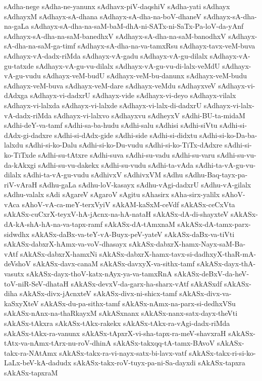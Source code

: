 {sAdha-nege
sAdha-ne-yanunx
sAdhavx-piV-daqshiV
sAdha-yati
sAdhayx
sAdhayxM
sAdhayx-sA-dhana
sAdhayx-sA-dha-na-boV-dhaneV
sAdhayx-sA-dha-na-gaLa
sAdhayx-sA-dha-na-saM-baM-dhA-ni-SATx-ni-SaTx-Pa-loV-da-yAnf
sAdhayx-sA-dha-na-saM-banedhxV
sAdhayx-sA-dha-na-saM-banodhxV
sAdhayx-sA-dha-na-saM-ga-timf
sAdhayx-sA-dha-na-va-tamxRsu
sAdhayx-tavx-veM-buva
sAdhayx-vA-dadx-riMda
sAdhayx-vA-gadu
sAdhayx-vA-gu-dilalx
sAdhayx-vA-gu-tatxde
sAdhayx-vA-gu-vu-dilalx
sAdhayx-vA-gu-vu-di-lalx-veMdU
sAdhayx-vA-gu-vudu
sAdhayx-veM-budU
sAdhayx-veM-bu-danunx
sAdhayx-veM-budu
sAdhayx-veM-buva
sAdhayx-veM-dare
sAdhayx-veMdu
sAdhayxveV
sAdhayx-vi-dAdxga
sAdhayx-vi-dadxrU
sAdhayx-vide
sAdhayx-vi-deyo
sAdhayx-vilalx
sAdhayx-vi-lalxda
sAdhayx-vi-lalxde
sAdhayx-vi-lalx-di-dadxrU
sAdhayx-vi-lalx-vA-dadx-riMda
sAdhayx-vi-lalxvo
sAdhayxvu
sAdheyxV
sAdhi-BU-ta-midaM
sAdhi-deY-va-tamf
sAdhi-sa-ba-hudu
sAdhi-salu
sAdhisi
sAdhi-siVtu
sAdhi-si-dAdx-gi-dadxre
sAdhi-si-dAdx-gide
sAdhi-side
sAdhi-si-didxtu
sAdhi-si-ko-Da-ba-lalxdu
sAdhi-si-ko-Dalu
sAdhi-si-ko-Du-vudu
sAdhi-si-ko-TiTx-dAdxre
sAdhi-si-ko-TiTxde
sAdhi-su-tAtxre
sAdhi-suva
sAdhi-su-vadu
sAdhi-su-varu
sAdhi-su-vu-da-kAkxgi
sAdhi-su-vu-dakekx
sAdhi-su-vudu
sAdhi-ta-vAda
sAdhi-ta-vA-gu-vu-dilalx
sAdhi-ta-vA-gu-vudu
sAdhivxV
sAdhivxVM
sAdhu
sAdhu-Baq-tayx-pa-riV-vAraH
sAdhu-gaLa
sAdhu-loV-kasayx
sAdhu-vAgi-dadxrU
sAdhu-vA-gilalx
sAdhu-valalx
sAdi
sAgareV
sAgaroV
sAgitu
sAhasirx
sAha-sirx-yalilx
sAhoV-vAca
sAhoV-vA-ca-meY-terxVyiV
sAkAM-kaSxM-ceVdf
sAkASx-ceCxVta
sAkASx-cuCxrX-teyxV-hA-jAcnx-na-hA-nataH
sAkASx-dA-di-shayxteV
sAkASx-dA-kA-shA-hA-na-va-tapx-ramf
sAkASx-dA-tAmxnaM
sAkASx-dA-tamx-parx-sidwdhx
sAkASx-daBx-va-teY-vA-Buyx-peV-yateV
sAkASx-daBx-va-tiVti
sAkASx-dabxrX-hAmx-va-voV-dhasayx
sAkASx-dabxrX-hamx-Nayx-saM-Ba-vAtf
sAkASx-dabxrX-hamxNi
sAkASx-dabxrX-hamx-tavx-si-dadhxyX-thaR-mA-deVshoV
sAkASx-davx-canaM
sAkASx-davxyX-va-sithx-tamf
sAkASx-dayx-thA-vasutx
sAkASx-dayx-thoV-katx-nAyx-ya-va-tamxRnA
sAkASx-deBxV-da-heV-toV-niR-SeV-dhataH
sAkASx-devxV-da-garx-ha-sharx-vAtf
sAkASxdf
sAkASx-diha
sAkASx-divx-jAcnxteV
sAkASx-divx-ni-shicx-tamf
sAkASx-divx-va-kaSxyXteV
sAkASx-du-pa-sithx-tamf
sAkASx-nAmx-na-parx-si-dedhxVSu
sAkASx-nAnx-na-thaRkayxM
sAkASxnanx
sAkASx-nanx-satx-dayx-theVti
sAkASx-tAkxra
sAkASx-tAkx-rakekx
sAkASx-tAkx-ra-vAgi-dadx-riMda
sAkASx-tAkx-ra-vanunx
sAkASx-tApxrX-vi-sha-tapx-ra-meV-shavxraH
sAkASx-tAtx-va-nAmx-tArx-nu-roV-dhinA
sAkASx-takxqq-tA-tamx-BAvoV
sAkASx-takx-ra-NAtAmx
sAkASx-takx-ra-vi-nayx-satx-bi-lavx-vatf
sAkASx-takx-ri-si-ko-LaLx-beV-kA-dadudx
sAkASx-takx-roV-tuyx-pa-ni-Sa-dayxdi
sAkASx-tapxra
sAkASx-tapxraM
}
